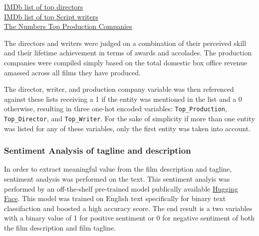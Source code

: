 \documentclass[
]{agujournal2019}
\begin{document}
\href{https://www.imdb.com/list/ls052380992/}{IMDb list of top
directors}\\
\href{https://www.imdb.com/list/ls064457317/}{IMDb list of top Script
writers}\\
\href{https://www.the-numbers.com/movies/production-companies/\#production_companies_overview=od1}{The
Numbers Top Production Companies}

The directors and writers were judged on a combination of their
perceived skill and their lifetime achievement in terms of awards and
accolades. The production companies were compiled simply based on the
total domestic box office revenue amassed across all films they have
produced.

The director, writer, and production company variable was then
referenced against these lists receiving a 1 if the entity was mentioned
in the list and a 0 otherwise, resulting in three one-hot encoded
variables: \texttt{Top\_Production}, \texttt{Top\_Director}, and
\texttt{Top\_Writer}. For the sake of simplicity if more than one entity
was listed for any of these variables, only the first entity was taken
into account.

\subsubsection{Sentiment Analysis of tagline and
description}\label{sentiment-analysis-of-tagline-and-description}

In order to extract meaningful value from the film description and
tagline, sentiment analysis was performed on the text. This sentiment
analyis was performed by an off-the-shelf pre-trained model publically
available
\href{https://huggingface.co/distilbert/distilbert-base-uncased-finetuned-sst-2-english}{Hugging
Face}. This model was trained on English text specifically for binary
text classifaction and boosted a high accuracy score. The end result is
a two variables with a binary value of 1 for positive sentiment or 0 for
negative sentiment of both the film description and film tagline.
\end{document}
